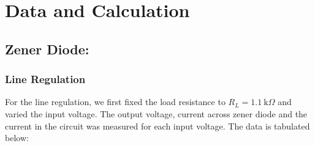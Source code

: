 \documentclass{scrartcl}
\begin{document}
\section{Data and Calculation}
\subsection{Zener Diode:}
\subsubsection{Line Regulation }
For the line regulation, we first fixed the load resistance to $R_L = 1.1 \ \mathrm{k}\Omega$ and varied the input voltage. The output voltage, current across zener diode and the current in the circuit was measured for each input voltage. The data is tabulated below:
\end{document}
